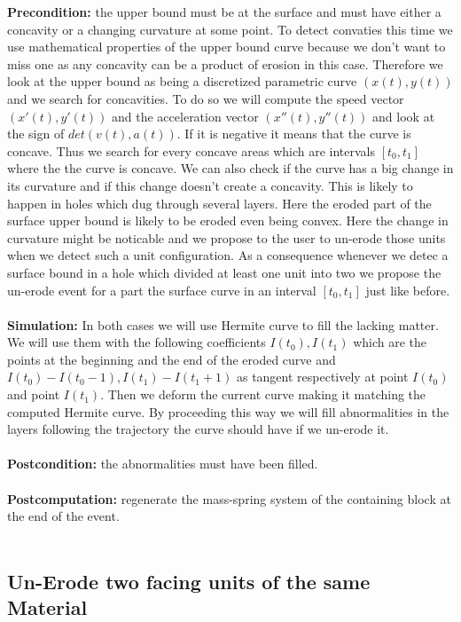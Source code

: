 \documentclass[12pt, a4paper]{memoir} %
\begin{document}
\textbf{Precondition:} the upper bound must be at the surface and must have either a concavity or a changing curvature at some point. To detect convaties this time we use mathematical properties of the upper bound curve because we don't want to miss one as any concavity can be a product of erosion in this case. Therefore we look at the upper bound as being a discretized parametric curve $(x(t),y(t))$ and we search for concavities. To do so we will compute the speed vector $(x'(t),y'(t))$ and the acceleration vector $(x''(t),y''(t))$ and look at the sign of $det(v(t),a(t))$. If it is negative it means that the curve is concave. Thus we search for every concave areas which are intervals $[t_0,t_1]$ where the the curve is concave. We can also check if the curve has a big change in its curvature and if this change doesn't create a concavity. This is likely to happen  in holes which dug through several layers. Here the eroded part of the surface upper bound is likely to be eroded even being convex. Here the change in curvature might be noticable and we propose to the user to un-erode those units when we detect such a unit configuration. As a consequence whenever we detec a surface bound in a hole which divided at least one unit into two we propose the un-erode event for a part the surface curve in an interval $[t_0,t_1]$ just like before.\\\\
\textbf{Simulation:} In both cases we will use Hermite curve to fill the lacking matter. We will use them with the following coefficients $I(t_0), I(t_1)$ which are the points at the beginning and the end of the eroded curve and $I(t_0) - I(t_0 - 1), I(t_1) - I(t_1 + 1)$  as tangent respectively at point $I(t_0)$ and point $I(t_1)$. Then we deform the current curve making it matching the computed Hermite curve. By proceeding this way we will fill abnormalities in the layers following the trajectory the curve should have if we un-erode it.\\\\
\textbf{Postcondition:} the abnormalities must have been filled.\\\\
\textbf{Postcomputation:} regenerate the mass-spring system of the containing block at the end of the event.\\\\

\subsection{Un-Erode two facing units of the same Material}
\end{document}
